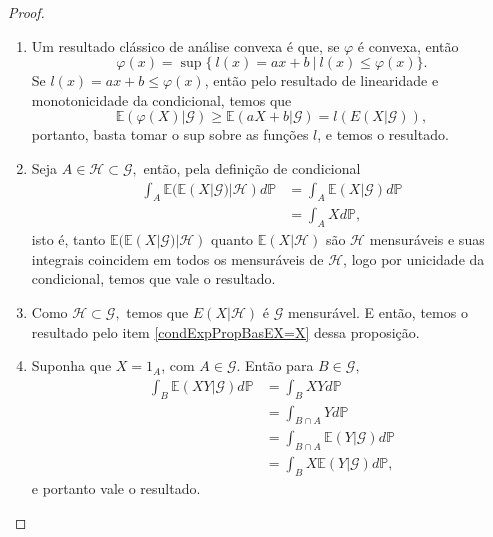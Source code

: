 \documentclass[12pt,a4paper,oneside]{book}
\theoremstyle{definition}
\theoremstyle{remark}
\numberwithin{equation}{section}
\newcommand{\E}{\mathbb{E}}
\newcommand{\pr}{\mathbb{P}}
\begin{document}
\begin{proof}
\begin{enumerate}
\item Um resultado clássico de análise convexa é que, se $\varphi$ é convexa, então
$$\varphi(x) = \sup\{\ l(x)=ax+b\ |\ l(x)\leq \varphi(x)\}. $$
Se $l(x)=ax+b\leq \varphi(x)$, então pelo resultado de linearidade e monotonicidade da condicional, temos que
$$\E(\varphi(X)|\mathcal{G})\geq \E(aX+b|\mathcal{G}) = l(E(X|\mathcal{G})), $$
portanto, basta tomar o sup sobre as funções $l$, e temos o resultado.

\item Seja $A\in \mathcal{H}\subset \mathcal{G},$ então, pela definição de condicional
\begin{align*}
\int_A\E( \E(X|\mathcal{G})|\mathcal{H}) d\pr &= \int_A \E(X|\mathcal{G})d\pr \\
                 &=\int_A Xd\pr,
\end{align*}
isto é, tanto $\E( \E(X|\mathcal{G})|\mathcal{H})$ quanto $\E( X|\mathcal{H})$ são $\mathcal{H}$ mensuráveis e suas integrais coincidem em todos os mensuráveis de $\mathcal{H}$, logo por unicidade da condicional, temos que vale o resultado.

\item Como $\mathcal{H}\subset \mathcal{G},$ temos que $E(X|\mathcal{H} )$ é $\mathcal{G}$ mensurável. E então, temos o resultado pelo item \ref{condExpPropBasEX=X} dessa proposição.

\item Suponha que $X=1_A$, com $A\in\mathcal{G}$. Então para $B\in \mathcal{G},$
\begin{align*}
\int_B \E(XY|\mathcal{G})d\pr &= \int_B XYd\pr\\ 
		&=\int_{B\cap A}Yd\pr \\
&= \int_{B\cap A}\E(Y|\mathcal{G}) d\pr\\ 
&= \int_{B}X\E(Y|\mathcal{G}) d\pr,
\end{align*}
e portanto vale o resultado.
\end{enumerate}

\end{proof}
\end{document}

